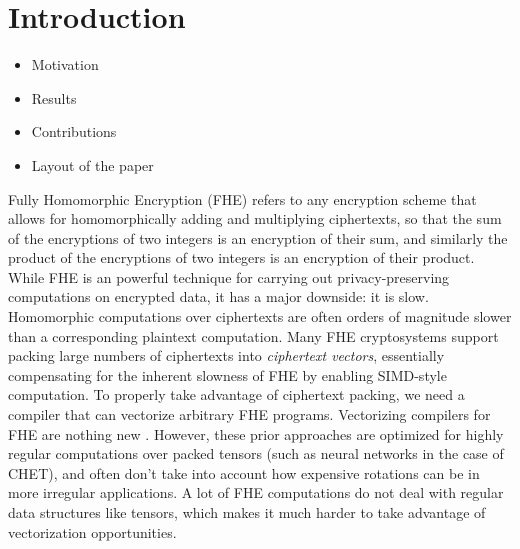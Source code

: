 \section{Introduction}\label{sec:intro}
\begin{itemize}
    \item Motivation
    \item Results
    \item Contributions
    \item Layout of the paper
\end{itemize}

Fully Homomorphic Encryption (FHE) refers to any encryption scheme that allows for homomorphically adding and multiplying ciphertexts, so that the sum of the encryptions of two integers is an encryption of their sum, and similarly the product of the encryptions of two integers is an encryption of their product.
While FHE is an powerful technique for carrying out privacy-preserving computations on encrypted data, it has a major downside: it is slow.
Homomorphic computations over ciphertexts are often orders of magnitude slower than a corresponding plaintext computation.
Many FHE cryptosystems support packing large numbers of ciphertexts into {\em ciphertext vectors}, essentially compensating for the inherent slowness of FHE by enabling SIMD-style computation.
To properly take advantage of ciphertext packing, we need a compiler that can vectorize arbitrary FHE programs.
Vectorizing compilers for FHE are nothing new \cite{CHET, Porcupine}.
However, these prior approaches are optimized for highly regular computations over packed tensors (such as neural networks in the case of CHET), and often don't take into account how expensive rotations can be in more irregular applications.
A lot of FHE computations do not deal with regular data structures like tensors, which makes it much harder to take advantage of vectorization opportunities.

